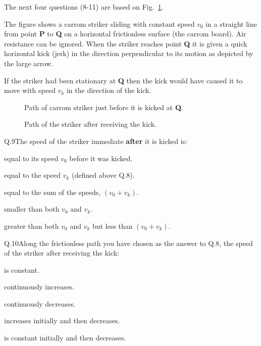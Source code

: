     \newpage
    The next four questions (8-11) are based on Fig.~\ref{fig:carrom-kick}.

    The figure shows a carrom striker sliding with constant speed $v_0$ in a straight line from point \textbf{P} to \textbf{Q} on a horizontal frictionless surface (the carrom board).
    Air resistance can be ignored.
    When the striker reaches point \textbf{Q} it is given a quick horizontal kick (jerk) in the direction perpendicular to its motion as depicted by the large arrow.

    If the striker had been stationary at \textbf{Q} then the kick would have caused it to move with speed $v_k$ in the direction of the kick.

    \begin{figure}[h!]
        \begin{center}
            
        \end{center}
        \caption{\label{fig:carrom-kick} Path of carrom striker just before it is kicked at \textbf{Q}.}
    \end{figure}


    \begin{figure}[h!]
        \begin{center}
            
        \end{center}
        \caption{\label{fig:carrom-paths} Path of the striker after receiving the kick.}
    \end{figure}

    \begin{mcq}{Q.9}{The speed of the striker immediate \textbf{after} it is kicked is:}
        \item equal to its speed $v_0$ before it was kicked.
        \item equal to the speed $v_k$ (defined above Q.8).
        \item equal to the sum of the speeds, $(v_0 + v_k)$.
        \item smaller than both $v_0$ and $v_k$.
        \item greater than both $v_0$ and $v_k$ but less than $(v_0 + v_k)$.
    \end{mcq}

    \begin{mcq}{Q.10}{Along the frictionless path you have chosen as the answer to Q.8, the speed of the striker after receiving the kick:}
        \item is constant.
        \item continuously increases.
        \item continuously decreases.
        \item increases initially and then decreases.
        \item is constant initially and then decreases.
    \end{mcq}

